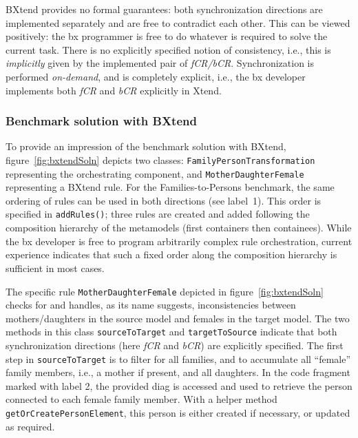 BXtend provides no formal guarantees: both synchronization directions are implemented separately and are free to contradict each other.
This can be viewed positively: the bx programmer is free to do whatever is required to solve the current task.
%
There is no explicitly specified notion of consistency, i.e., this is \emph{implicitly} given by the implemented pair of \emph{fCR/bCR}.
%
Synchronization is performed \emph{on-demand}, and is completely explicit, i.e., the bx developer implements both \emph{fCR} and \emph{bCR} explicitly in Xtend.

\subsubsection{Benchmark solution with BXtend}

To provide an impression of the benchmark solution with BXtend, figure~\ref{fig:bxtendSoln} depicts two classes:  \texttt{Family\-Person\-Transforma\-tion} representing the orchestrating component, and \texttt{Mother\-Daughter\-Female} representing a BXtend rule.
For the Families-to-Persons benchmark, the same ordering of rules can be used in both directions (see label~1).
This order is specified in \texttt{addRules()}; three rules are created and added following the composition hierarchy of the metamodels (first containers then containees).
While the bx developer is free to program arbitrarily complex rule orchestration, current experience indicates that such a fixed order along the composition hierarchy is sufficient in most cases.


The specific rule \texttt{Mother\-Daughter\-Female} depicted in figure~\ref{fig:bxtendSoln} checks for and handles, as its name suggests, inconsistencies between mothers/daughters in the source model and females in the target model.
The two methods in this class \texttt{source\-To\-Target} and \texttt{target\-To\-Source} indicate that both synchronization directions (here \emph{fCR} and \emph{bCR}) are explicitly specified.
The first step in \texttt{source\-To\-Target} is to filter for all families, and to accumulate all ``female'' family members, i.e., a mother if present, and all daughters.
In the code fragment marked with label 2, the provided diag is accessed and used to retrieve the person connected to each female family member.
With a helper method \texttt{get\-Or\-Create\-Person\-Element}, this person is either created if necessary, or updated as required.
